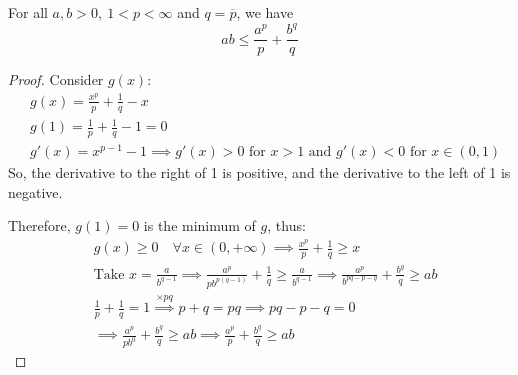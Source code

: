 \begin{theorem}
    For all $a, b > 0,\ 1 < p < \infty$ and $q = \overline{p}$, we have
    \[
        ab \le \frac{a^p}{p} + \frac{b^q}{q}
    \]
\end{theorem}
\begin{proof}
    Consider $g(x)$:
    \begin{align*}
        &
        g(x) = \frac{x^p}{p} + \frac{1}{q} - x
        \\&
        g(1) = \frac{1}{p} + \frac{1}{q} - 1 = 0
        \\&
        g'(x) = x^{p-1} - 1 \implies g'(x) > 0
        \text{ for } x > 1 \text{ and } g'(x) < 0 \text{ for } x \in (0, 1)
    \end{align*}
    So, the derivative to the right of 1 is positive, and the derivative to the left of 1 is negative.
    \begin{center}   
    \end{center}
    Therefore, $g(1) = 0$ is the minimum of $g$, thus:
    \begin{align*}
        &
        g(x) \ge 0 \quad \forall x \in (0, +\infty) \implies
        \frac{x^p}{p} + \frac{1}{q} \ge x
        \\&
        \text{Take } x = \frac{a}{b^{q - 1}}  \implies
        \frac{a^p}{pb^{p(q-1)}} + \frac{1}{q} \ge \frac{a}{b^{q-1}} \implies
        \frac{a^p}{b^{pq - p - q}} + \frac{b^q}{q} \ge ab
        \\&
        \frac{1}{p} + \frac{1}{q} = 1 \overset{\times pq}{\implies} p + q = pq \implies 
        pq - p - q = 0
        \\&
        \implies \frac{a^p}{p b^0} + \frac{b^q}{q} \ge ab \implies
        \frac{a^p}{p} + \frac{b^q}{q} \ge ab 
    \end{align*}
\end{proof}
